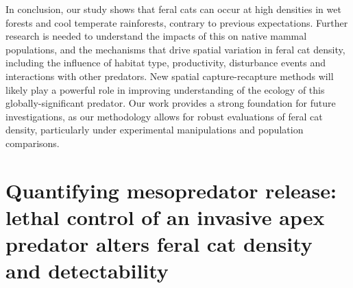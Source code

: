 \documentclass[11pt,a4paper,titlepage,twoside,openright]{style/unimelbthesis}
\begin{document}
\begin{mainmatter}
In conclusion, our study shows that feral cats can occur at high densities in wet forests and cool temperate rainforests, contrary to previous expectations. Further research is needed to understand the impacts of this on native mammal populations, and the mechanisms that drive spatial variation in feral cat density, including the influence of habitat type, productivity, disturbance events and interactions with other predators. New spatial capture-recapture methods will likely play a powerful role in improving understanding of the ecology of this globally-significant predator. Our work provides a strong foundation for future investigations, as our methodology allows for robust evaluations of feral cat density, particularly under experimental manipulations and population comparisons.

\hypertarget{density}{%
\chapter{Quantifying mesopredator release: lethal control of an invasive apex predator alters feral cat density and detectability}\label{density}}

\hypertarget{abstract-3}{%
}
\end{mainmatter}
\end{document}
